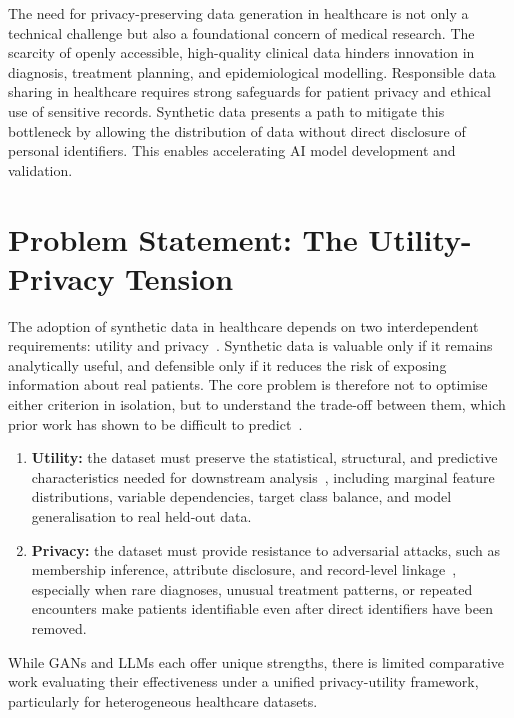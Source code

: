 The need for privacy-preserving data generation in healthcare is not only a
technical challenge but also a foundational concern of medical research. The
scarcity of openly accessible, high-quality clinical data hinders
innovation in diagnosis, treatment planning, and epidemiological modelling.
Responsible data sharing in healthcare requires strong safeguards for patient
privacy and ethical use of sensitive records. Synthetic data presents a path to mitigate
this bottleneck by allowing the distribution of data without direct disclosure
of personal identifiers. This enables accelerating AI model development and
validation.

\section{Problem Statement: The Utility-Privacy Tension}
\label{sec:intro:problem}

The adoption of synthetic data in healthcare depends on two interdependent
requirements: utility and privacy~\cite{kaabachi2025scoping}. Synthetic data is
valuable only if it remains analytically useful, and defensible only if it
reduces the risk of exposing information about real patients. The core problem
is therefore not to optimise either criterion in isolation, but to understand
the trade-off between them, which prior work has shown to be difficult to
predict~\cite{stadler2022synthetic}.

\begin{enumerate}\itemsep0.25em
    \item \textbf{Utility:} the dataset must preserve the statistical,
        structural, and predictive characteristics needed for downstream
        analysis~\cite{kaabachi2025scoping}, including marginal feature
        distributions, variable dependencies, target class balance, and model
        generalisation to real held-out data.
  \item \textbf{Privacy:} the dataset must provide resistance to adversarial
        attacks, such as membership inference, attribute disclosure, and
        record-level linkage~\cite{kaabachi2025scoping}, especially when rare
        diagnoses, unusual treatment patterns, or repeated encounters make
        patients identifiable even after direct identifiers have been removed.
\end{enumerate}
While GANs and LLMs each offer unique strengths, there is limited comparative
work evaluating their effectiveness under a unified privacy-utility framework,
particularly for heterogeneous healthcare datasets.

